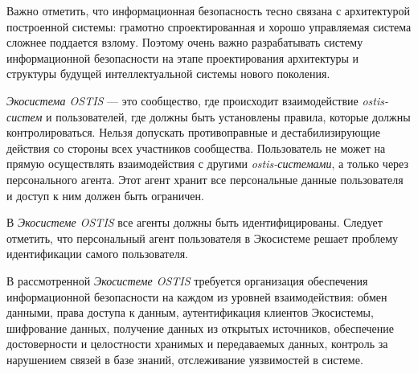 Важно отметить, что информационная безопасность тесно связана с архитектурой построенной системы: грамотно спроектированная и хорошо управляемая система сложнее поддается взлому. Поэтому очень важно разрабатывать систему информационной безопасности на этапе проектирования архитектуры и структуры будущей интеллектуальной системы нового поколения.

\textit{Экосистема OSTIS} --- это сообщество, где происходит взаимодействие \textit{ostis-систем} и пользователей, где должны быть установлены правила, которые должны контролироваться. Нельзя допускать противоправные и дестабилизирующие действия со стороны всех участников сообщества. Пользователь не может на прямую осуществлять взаимодействия с другими \textit{ostis-системами}, а только через персонального агента. Этот агент хранит все персональные данные пользователя и доступ к ним должен быть ограничен.

В \textit{Экосистеме OSTIS} все агенты должны быть идентифицированы. Следует отметить, что персональный агент пользователя в Экосистеме решает проблему идентификации самого пользователя.

В рассмотренной \textit{Экосистеме OSTIS} требуется организация обеспечения информационной безопасности на каждом из уровней взаимодействия: обмен данными, права доступа к данным, аутентификация клиентов Экосистемы, шифрование данных, получение данных из открытых источников, обеспечение достоверности и целостности хранимых и передаваемых данных, контроль за нарушением связей в базе знаний, отслеживание уязвимостей в системе.

